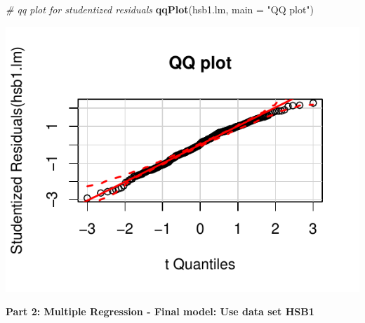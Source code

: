 \documentclass[]{article}
\newenvironment{Shaded}{\begin{snugshade}}{\end{snugshade}}
\newcommand{\KeywordTok}[1]{\textcolor[rgb]{0.13,0.29,0.53}{\textbf{{#1}}}}
\newcommand{\DataTypeTok}[1]{\textcolor[rgb]{0.13,0.29,0.53}{{#1}}}
\newcommand{\StringTok}[1]{\textcolor[rgb]{0.31,0.60,0.02}{{#1}}}
\newcommand{\CommentTok}[1]{\textcolor[rgb]{0.56,0.35,0.01}{\textit{{#1}}}}
\newcommand{\NormalTok}[1]{{#1}}
\begin{document}
\begin{Shaded}
\begin{Highlighting}[]
\CommentTok{# qq plot for studentized residuals}
\KeywordTok{qqPlot}\NormalTok{(hsb1.lm, }\DataTypeTok{main =} \StringTok{"QQ plot"}\NormalTok{)}
\end{Highlighting}
\end{Shaded}

\includegraphics{Homework_3_Revised_Minoo_files/figure-latex/unnamed-chunk-4-7.pdf}

\begin{center}
\Large \textbf{Part 2: Multiple Regression - Final model: Use data set HSB1}
\end{center}
\end{document}
